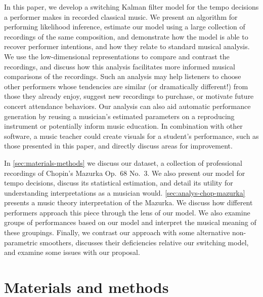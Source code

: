 \documentclass[aoas]{imsart}
\begin{document}
In this paper, we develop a switching Kalman filter model for the
tempo decisions a performer makes in recorded classical music. We
present an algorithm for performing likelihood inference, estimate our
model using a large collection of recordings of the same composition,
and demonstrate how the model is able to recover performer intentions,
and how they relate to standard musical analysis. We use the 
low-dimensional representations to compare and contrast the recordings, and 
discuss how this analysis facilitates more informed musical
comparisons of the recordings. Such an analysis may help listeners to
choose other performers whose tendencies are similar (or dramatically
different!) from those they already enjoy, suggest new recordings to
purchase, or motivate future concert attendance behaviors. Our
analysis can also aid automatic performance generation by reusing a
musician's estimated parameters on a reproducing instrument or
potentially inform
music education. In combination with other software, a music teacher
could create visuals for a student's performance, such as those
presented in this paper, and directly discuss areas for improvement.

In \autoref{sec:materials-methods} we discuss our dataset, a
collection of professional recordings of Chopin's Mazurka Op.\ 68 No.\
3. We also present our model for tempo decisions, discuss its
statistical estimation, and detail its utility for understanding
interpretations as a musician would. \autoref{sec:analys-chop-mazurka}
presents a music theory interpretation of the Mazurka. We discuss how
different performers approach this piece through the lens of our model.
We also examine groups of performances based on our model and
interpret the musical 
meaning of these groupings.  Finally, we contrast our approach with
some alternative non-parametric
smoothers, discusses their deficiencies relative our switching model,
and examine some issues with our proposal.




\section{Materials and methods}
\label{sec:materials-methods}




\end{document}
